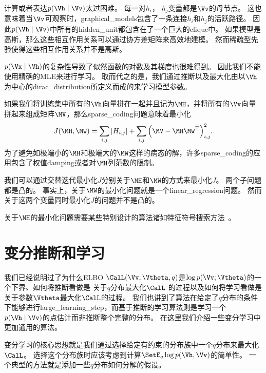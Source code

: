 计算或者表达$p(\Vh\mid\Vv)$太过困难。
每一对$h_i$， $h_j$变量都是$\Vv$的母节点。
这也意味着当$\Vv$可观察时，\gls{graphical_models}包含了一条连接$h_i$和$h_j$的活跃路径。
因此$p(\Vh \mid\Vv)$中所有的\gls{hidden_unit}都包含在了一个巨大的\gls{clique}中。
如果模型是高斯，那么这些相互作用关系可以通过协方差矩阵来高效地建模。
然而稀疏型先验使得这些相互作用关系并不是高斯。



$p(\Vx\mid\Vh)$的复杂性导致了似然函数的对数及其梯度也很难得到。
因此我们不能使用精确的\gls{MLE}来进行学习。
取而代之的是，我们通过推断以及最大化由以$\Vh$为中心的\gls{dirac_distribution}所定义而成的来学习模型参数。


如果我们将训练集中所有的$\Vh$向量拼在一起并且记为$\MH$，并将所有的$\Vv$向量拼起来组成矩阵$\MV$，那么\gls{sparse_coding}问题意味着最小化
\begin{align}
	J(\MH,\MW) = \sum_{i,j}^{}\vert H_{i,j}\vert + \sum_{i,j}^{}\Big(\MV - \MH \MW^{\top}\Big)^2_{i,j}.
\end{align}
为了避免如极端小的$\MH$和极端大的$\MW$这样的病态的解，许多\gls{sparse_coding}的应用包含了权值\gls{damping}或者对$\MH$列范数的限制。


我们可以通过交替迭代最小化$J$分别关于$\MH$和$\MW$的方式来最小化$J$。
两个子问题都是凸的。
事实上，关于$\MW$的最小化问题就是一个\gls{linear_regression}问题。
然而关于这两个变量同时最小化$J$的问题并不是凸的。


关于$\MH$的最小化问题需要某些特别设计的算法诸如特征符号搜索方法~\citep{HonglakLee-2007}。


\section{变分推断和学习}
\label{sec:variational_inference_and_learning}


我们已经说明过了为什么\gls{ELBO} $\CalL(\Vv,\Vtheta,q)$是$\log  p(\Vv;\Vtheta)$的一个下界、如何将推断看做是 关于$q$分布最大化$\CalL$ 的过程以及如何将学习看做是关于参数$\Vtheta$最大化$\CalL$的过程。
我们也讲到了算法在给定了$q$分布的条件下能够进行\gls{large_learning_step}，而基于推断的学习算法则是学习一个$p(\Vh \mid \Vv)$的点估计而非推断整个完整的分布。
在这里我们介绍一些变分学习中更加通用的算法。


变分学习的核心思想就是我们通过选择给定有约束的分布族中一个$q$分布来最大化$\CalL$。
选择这个分布族时应该考虑到计算$\SetE_q \log p(\Vh,\Vv)$的简单性。
一个典型的方法就是添加一些$q$分布如何分解的假设。


